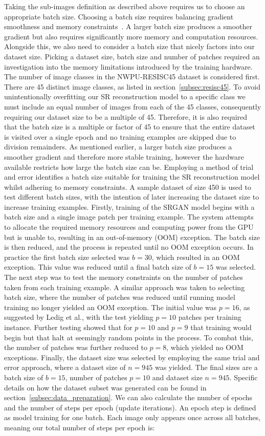 Taking the sub-images definition as described above requires us to choose an appropriate batch size. Choosing a batch size requires balancing gradient smoothness and memory constraints~\cite{ref}. A larger batch size produces a smoother gradient but also requires significantly more memory and computation resources. Alongside this, we also need to consider a batch size that nicely factors into our dataset size. Picking a dataset size, batch size and number of patches required an investigation into the memory limitations introduced by the training hardware. The number of image classes in the NWPU-RESISC45 dataset is considered first. There are 45 distinct image classes, as listed in section~\ref{subsec:resisc45}. To avoid unintentionally overfitting our SR reconstruction model to a specific class we must include an equal number of images from each of the 45 classes, consequently requiring our dataset size to be a multiple of 45. Therefore, it is also required that the batch size is a multiple or factor of 45 to ensure that the entire dataset is visited over a single epoch and no training examples are skipped due to division remainders. As mentioned earlier, a larger batch size produces a smoother gradient and therefore more stable training, however the hardware available restricts how large the batch size can be. Employing a method of trial and error identifies a batch size suitable for training the SR reconstruction model whilst adhering to memory constraints. A sample dataset of size 450 is used to test different batch sizes, with the intention of later increasing the dataset size to increase training examples. Firstly, training of the SRGAN model begins with a batch size and a single image patch per training example. The system attempts to allocate the required memory resources and computing power from the GPU but is unable to, resulting in an out-of-memory (OOM) exception. The batch size is then reduced, and the process is repeated until no OOM exception occurs. In practice the first batch size selected was $b = 30$, which resulted in an OOM exception. This value was reduced until a final batch size of $b = 15$ was selected. The next step was to test the memory constraints on the number of patches taken from each training example. A similar approach was taken to selecting batch size, where the number of patches was reduced until running model training no longer yielded an OOM exception. The initial value was $p = 16$, as suggested by Ledig et al., with the test yielding $p = 10$ patches per training instance. Further testing showed that for $p = 10$ and $p = 9$ that training would begin but that halt at seemingly random points in the process. To combat this, the number of patches was further reduced to $p = 8$, which yielded no OOM exceptions. Finally, the dataset size was selected by employing the same trial and error approach, where a dataset size of $n = 945$ was yielded. The final sizes are a batch size of $b = 15$, number of patches $p = 10$ and dataset size $n = 945$. Specific details on how the dataset subset was generated can be found in section~\ref{subsec:data_preparation}. We can also calculate the number of epochs and the number of steps per epoch (update iterations). An epoch step is defined as model training for one batch. Each image only appears once across all batches, meaning our total number of steps per epoch is:
